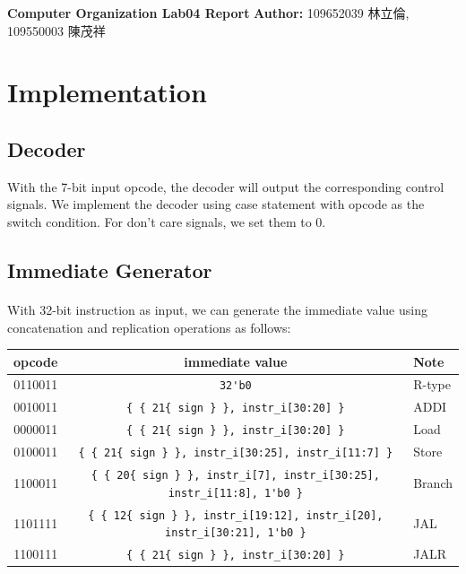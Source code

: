 \documentclass{article}
\begin{document}
\begin{CJK*}{UTF8}{bkai}
    \begin{center}
        {\Huge \textbf{Computer Organization Lab04 Report}}
        {\large \textbf{Author:} 109652039 林立倫, 109550003 陳茂祥}
    \end{center}
\end{CJK*}

\section{Implementation}

\subsection{Decoder}

With the 7-bit input opcode, the decoder will output the corresponding control signals.
We implement the decoder using case statement with opcode as the switch condition.
For don't care signals, we set them to 0.

\subsection{Immediate Generator}

\paragraph{}
With 32-bit instruction as input, 
we can generate the immediate value using concatenation and replication operations as follows:

\begin{center}
    \begin{tabular}{c|c|l}
    opcode & immediate value & Note \\
    \hline
    0110011 & \verb|32'b0| & R-type \\
    0010011 & \verb|{ { 21{ sign } }, instr_i[30:20] }| & ADDI \\
    0000011 & \verb|{ { 21{ sign } }, instr_i[30:20] }| & Load \\   
    0100011 & \verb|{ { 21{ sign } }, instr_i[30:25], instr_i[11:7] }| & Store \\
    1100011 & \verb|{ { 20{ sign } }, instr_i[7], instr_i[30:25], instr_i[11:8], 1'b0 }| & Branch \\
    1101111 & \verb|{ { 12{ sign } }, instr_i[19:12], instr_i[20], instr_i[30:21], 1'b0 }| & JAL \\
    1100111 & \verb|{ { 21{ sign } }, instr_i[30:20] }| & JALR \\
    \end{tabular}
\end{center}
\end{document}
